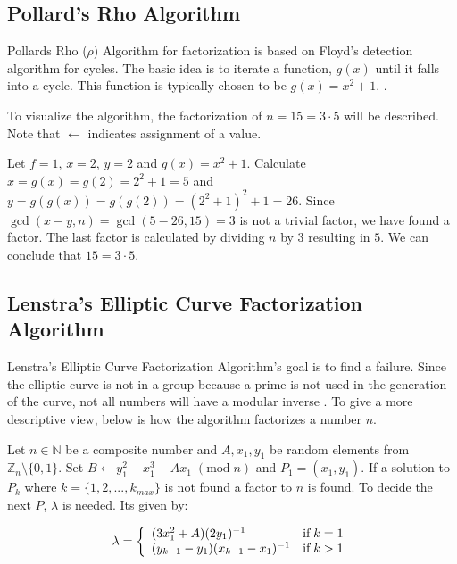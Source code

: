 \subsection{Pollard's Rho Algorithm}
Pollards Rho ($\rho$) Algorithm for factorization is based on Floyd's detection algorithm for cycles. The basic idea is to iterate a function, $g(x)$ until it falls into a cycle. This function is typically chosen to be $g(x)=x^2+1$. \cite{pollardsRhoAlgorithm}\cite{pollardsRhoAlgorithm2}.

To visualize the algorithm, the factorization of $n=15=3\cdot5$ will be described. Note that $\leftarrow$ indicates assignment of a value.

Let $f=1$, $x=2$, $y=2$ and $g(x)=x^2+1$. Calculate $x=g(x)=g(2)=2^2+1=5$ and $y=g(g(x))=g(g(2))=(2^2+1)^2+1=26$. Since $\gcd(x - y, n)=\gcd(5 - 26, 15)=3$ is not a trivial factor, we have found a factor. The last factor is calculated by dividing $n$ by $3$ resulting in $5$. We can conclude that $15=3\cdot5$.

\subsection{Lenstra's Elliptic Curve Factorization Algorithm}
Lenstra's Elliptic Curve Factorization Algorithm's goal is to find a failure. Since the elliptic curve is not in a group because a prime is not used in the generation of the curve, not all numbers will have a modular inverse \cite{LenstrasFactorizationAlgorithm}. To give a more descriptive view, below is how the algorithm factorizes a number $n$.

Let $n\in\mathbb{N}$ be a composite number and $A, x_1, y_1$ be random elements from $\mathbb{Z}_n \setminus \{0,1\}$. Set $B \leftarrow y_1^2 - x_1^3 - Ax_1\; (\text{mod}\;n)$ and $P_1 = (x_1,y_1)$. If a solution to $P_k$ where $k = \{1,2,...,k_{max}\}$ is not found a  factor to $n$ is found. To decide the next $P$, $\lambda$ is needed. Its given by:

\begin{equation*}
    \lambda = \left\{\begin{array}{l l}
         (3x_1^2 + A)(2y_1)^{-1} & \text{if}\; k = 1\\
         (y_{k-1} - y_1)(x_{k-1} - x_1)^{-1} & \text{if}\; k > 1
    \end{array}\right.
\end{equation*}

